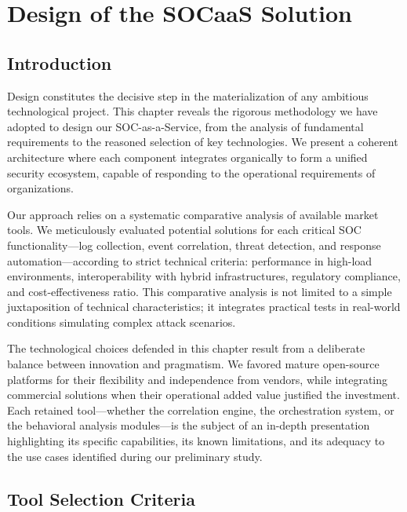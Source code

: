 \setcounter{chapter}{2}
\chapter{Design of the SOCaaS Solution}
\label{chap:design}

\section{Introduction}
\label{sec:intro}

Design constitutes the decisive step in the materialization of any ambitious technological project. This chapter reveals the rigorous methodology we have adopted to design our SOC-as-a-Service, from the analysis of fundamental requirements to the reasoned selection of key technologies. We present a coherent architecture where each component integrates organically to form a unified security ecosystem, capable of responding to the operational requirements of organizations.

Our approach relies on a systematic comparative analysis of available market tools. We meticulously evaluated potential solutions for each critical SOC functionality---log collection, event correlation, threat detection, and response automation---according to strict technical criteria: performance in high-load environments, interoperability with hybrid infrastructures, regulatory compliance, and cost-effectiveness ratio. This comparative analysis is not limited to a simple juxtaposition of technical characteristics; it integrates practical tests in real-world conditions simulating complex attack scenarios.

The technological choices defended in this chapter result from a deliberate balance between innovation and pragmatism. We favored mature open-source platforms for their flexibility and independence from vendors, while integrating commercial solutions when their operational added value justified the investment. Each retained tool---whether the correlation engine, the orchestration system, or the behavioral analysis modules---is the subject of an in-depth presentation highlighting its specific capabilities, its known limitations, and its adequacy to the use cases identified during our preliminary study.

\section{Tool Selection Criteria}
\label{sec:criteria}

